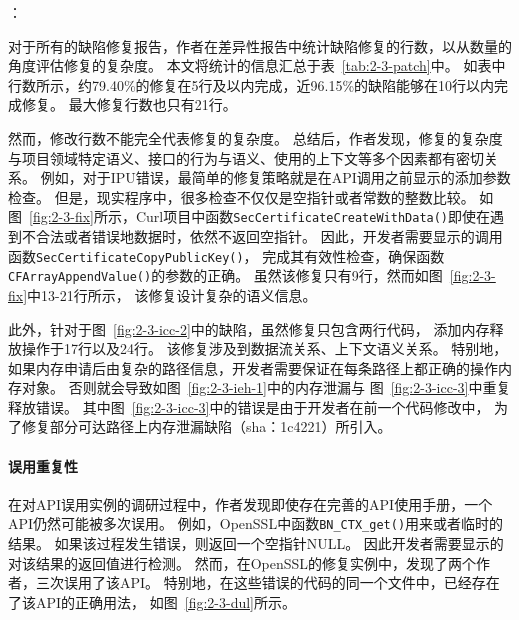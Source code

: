 \vspace*{10pt}
{}：

对于所有的缺陷修复报告，作者在差异性报告中统计缺陷修复的行数，以从数量的角度评估修复的复杂度。
本文将统计的信息汇总于表~\ref{tab:2-3-patch}中。
如表中行数所示，约79.40\%的修复在5行及以内完成，近96.15\%的缺陷能够在10行以内完成修复。
最大修复行数也只有21行。



然而，修改行数不能完全代表修复的复杂度。
总结后，作者发现，修复的复杂度与项目领域特定语义、接口的行为与语义、使用的上下文等多个因素都有密切关系。
例如，对于IPU错误，最简单的修复策略就是在API调用之前显示的添加参数检查。
但是，现实程序中，很多检查不仅仅是空指针或者常数的整数比较。
如图~\ref{fig:2-3-fix}所示，Curl项目中函数\texttt{SecCertificateCreateWithData()}即使在遇到不合法或者错误地数据时，依然不返回空指针。
因此，开发者需要显示的调用函数\texttt{SecCertificateCopyPublicKey()}，
完成其有效性检查，确保函数\texttt{CFArrayAppendValue()}的参数的正确。
虽然该修复只有9行，然而如图~\ref{fig:2-3-fix}中13-21行所示，
该修复设计复杂的语义信息。

此外，针对于图~\ref{fig:2-3-icc-2}中的缺陷，虽然修复只包含两行代码，
添加内存释放操作于17行以及24行。
该修复涉及到数据流关系、上下文语义关系。
特别地，如果内存申请后由复杂的路径信息，开发者需要保证在每条路径上都正确的操作内存对象。
否则就会导致如图~\ref{fig:2-3-ieh-1}中的内存泄漏与
图~\ref{fig:2-3-icc-3}中重复释放错误。
其中图~\ref{fig:2-3-icc-3}中的错误是由于开发者在前一个代码修改中，
为了修复部分可达路径上内存泄漏缺陷（sha：1c4221）所引入。

\vspace*{10pt}
\begin{center}
	\noindent{}
\end{center}



\paragraph{误用重复性}
在对API误用实例的调研过程中，作者发现即使存在完善的API使用手册，一个API仍然可能被多次误用。
例如，OpenSSL中函数\texttt{BN\_CTX\_get()}用来或者临时的结果。
如果该过程发生错误，则返回一个空指针NULL。
因此开发者需要显示的对该结果的返回值进行检测。
然而，在OpenSSL的修复实例中，发现了两个作者，三次误用了该API。
特别地，在这些错误的代码的同一个文件中，已经存在了该API的正确用法，
如图~\ref{fig:2-3-dul}所示。


